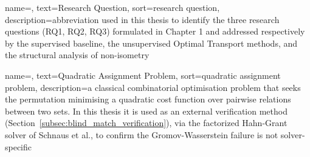  {
    name=,
    text=Research Question,
    sort=research question,
    description={abbreviation used in this thesis to identify the three research questions (RQ1, RQ2, RQ3) formulated in Chapter 1 and addressed respectively by the supervised baseline, the unsupervised Optimal Transport methods, and the structural analysis of non-isometry}
}

 {
    name=,
    text=Quadratic Assignment Problem,
    sort=quadratic assignment problem,
    description={a classical combinatorial optimisation problem that seeks the permutation minimising a quadratic cost function over pairwise relations between two sets. In this thesis it is used as an external verification method (Section~\ref{subsec:blind_match_verification}), via the factorized Hahn-Grant solver of Schnaus et al., to confirm the Gromov-Wasserstein failure is not solver-specific}
}
